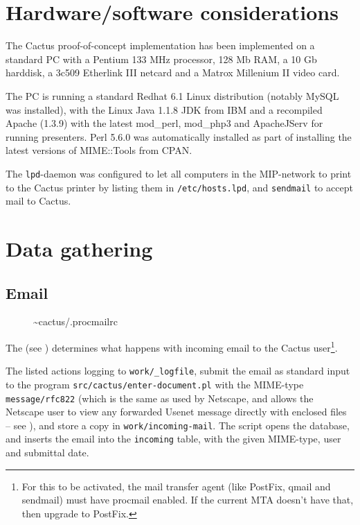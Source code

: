 \section{Hardware/software considerations}

The Cactus proof-of-concept implementation has been implemented on a
standard PC with a Pentium 133 MHz processor, 128 Mb RAM, a 10 Gb
harddisk, a 3c509 Etherlink III netcard and a Matrox Millenium II
video card.

The PC is running a standard Redhat 6.1 Linux distribution (notably
MySQL was installed), with the Linux Java 1.1.8 JDK from IBM and a
recompiled Apache (1.3.9) with the latest mod\_perl, mod\_php3 and
ApacheJServ for running presenters.  Perl 5.6.0 was automatically
installed as part of installing the latest versions of MIME::Tools
from CPAN.

The \texttt{lpd}-daemon was configured to let all computers in the
MIP-network to print to the Cactus printer by listing them in
\texttt{/etc/hosts.lpd}, and \texttt{sendmail} to accept mail to
Cactus.



\section{Data gathering}


\subsection{Email}

\begin{figure}[htbp]
  \begin{center}
    \caption{\~{}cactus/.procmailrc}
    \label{fig:cactus-procmailrc}
  \end{center}
\end{figure}

The  (see
) determines what happens with incoming
email to the Cactus user\footnote{For this to be activated, the mail
  transfer agent (like PostFix, qmail and sendmail) must have procmail
  enabled.  If the current MTA doesn't have that, then upgrade to
  PostFix.}.


The listed actions logging to \texttt{work/_logfile}, submit the email
as standard input to the program \texttt{src/cactus/enter-document.pl}
with the MIME-type \texttt{message/rfc822} (which is the same as used
by Netscape, and allows the Netscape user to view any forwarded Usenet
message directly with enclosed files -- see
), and store a copy in
\texttt{work/incoming-mail}.  The script opens the database, and
inserts the email into the \texttt{incoming} table, with the given
MIME-type, user and submittal date.

